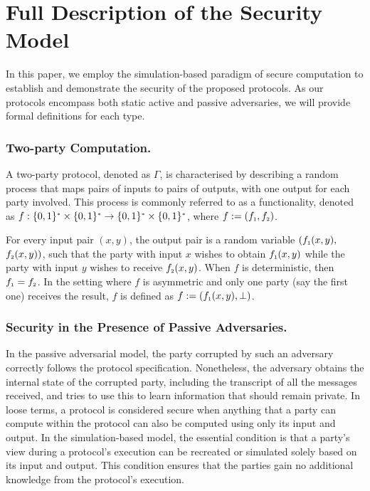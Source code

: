 

\section{Full Description of the Security Model}\label{sec::sec-model-long}

In this paper, we employ the simulation-based paradigm of secure computation \cite{DBLP:books/cu/Goldreich2004} to establish and demonstrate the security of the proposed protocols. As our protocols encompass both static active and passive adversaries, we will provide formal definitions for each type.%
 

 
 \subsubsection{Two-party Computation.} A two-party protocol, denoted as $\Gamma$, is characterised by describing a random process that maps pairs of inputs to pairs of outputs, with one output for each party involved. This process is commonly referred to as a functionality, denoted as  $f:\{0,1\}^{\scriptscriptstyle *}\times\{0,1\}^{\scriptscriptstyle *}\rightarrow\{0,1\}^{\scriptscriptstyle *}\times\{0,1\}^{\scriptscriptstyle *}$, where $f:=(f_{\scriptscriptstyle 1},f_{\scriptscriptstyle 2})$. 
 
 For every input pair $(x,y)$, the output pair is a random variable $(f_{\scriptscriptstyle 1} (x,y), $ $f_{\scriptscriptstyle 2} (x,y))$, such that the party with input $x$ wishes to obtain $f_{\scriptscriptstyle 1} (x,y)$ while the party with input $y$ wishes to receive $f_{\scriptscriptstyle 2} (x,y)$. When $f$ is deterministic, then $f_{\scriptscriptstyle 1} =f_{\scriptscriptstyle 2}$. In the setting where $f$ is asymmetric and only one party (say the first one) receives the result, $f$ is defined as $f:=(f_{\scriptscriptstyle 1}(x,y), \bot)$. 
 

 
 \subsubsection{Security in the Presence of Passive Adversaries.}  In the passive adversarial model, the party corrupted by such an adversary correctly follows the protocol specification. Nonetheless, the adversary obtains the internal state of the corrupted party, including the transcript of all the messages received, and tries to use this to learn information that should remain private. 
 In loose terms, a protocol is considered secure when anything that a party can compute within the protocol can also be computed using only its input and output. In the simulation-based model, the essential condition is that a party's view during a protocol's execution can be recreated or simulated solely based on its input and output. This condition ensures that the parties gain no additional knowledge from the protocol's execution.
 
